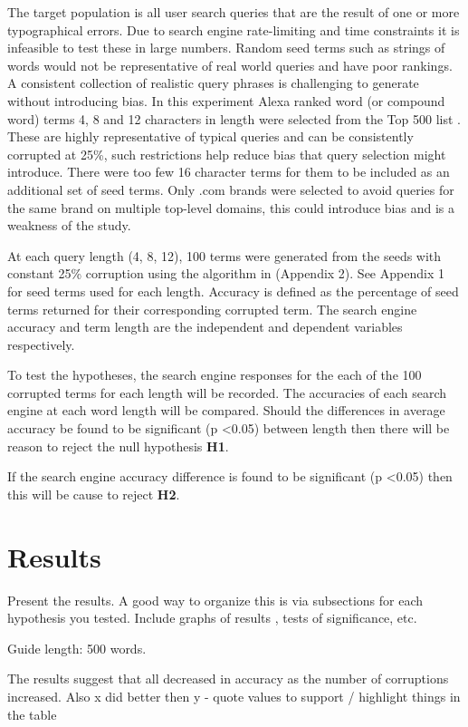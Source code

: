 \documentclass{csfourzero}
\begin{document}
The target population is all user search queries that are the result of one or more typographical errors. Due to search engine rate-limiting and time constraints it is infeasible to test these in large numbers. Random seed terms such as strings of words would not be representative of real world queries and have poor rankings. A consistent collection of realistic query phrases is challenging to generate without introducing bias. In this experiment Alexa ranked word (or compound word) terms 4, 8 and 12 characters in length were selected from the Top 500 list \cite{alexatop500}. These are highly representative of typical queries and can be consistently corrupted at 25\%, such restrictions help reduce bias that query selection might introduce. There were too few 16 character terms for them to be included as an additional set of seed terms. Only .com brands were selected to avoid queries for the same brand on multiple top-level domains, this could introduce bias and is a weakness of the study.

At each query length (4, 8, 12), 100 terms were generated from the seeds with constant 25\% corruption using the algorithm in (Appendix 2). See Appendix 1 for seed terms used for each length. Accuracy is defined as the percentage of seed terms returned for their corresponding corrupted term. The search engine accuracy and term length are the independent and dependent variables respectively.

To test the hypotheses, the search engine responses for the each of the 100 corrupted terms for each length will be recorded. The accuracies of each search engine at each word length will be compared. Should the differences in average accuracy be found to be significant (p \textless 0.05) between length then there will be reason to reject the null hypothesis \textbf{H1}.

If the search engine accuracy difference is found to be significant (p \textless 0.05) then this will be cause to reject \textbf{H2}.

\section{Results}
\label{sec:results}

Present the results. A good way to organize this is via subsections
for each hypothesis you tested. Include graphs of results
, tests of significance, etc.

Guide length: 500 words.

The results suggest that all decreased in accuracy as the number of corruptions increased. Also x did better then y - quote values to support / highlight things in the table
\end{document}
